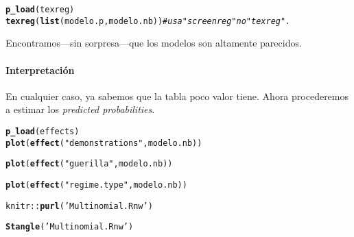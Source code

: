 \documentclass[onesided]{article}\usepackage[]{graphicx}\usepackage[]{color}
\makeatletter
\newcommand{\hlstr}[1]{\textcolor[rgb]{0.192,0.494,0.8}{#1}}%
\newcommand{\hlcom}[1]{\textcolor[rgb]{0.678,0.584,0.686}{\textit{#1}}}%
\newcommand{\hlopt}[1]{\textcolor[rgb]{0,0,0}{#1}}%
\newcommand{\hlstd}[1]{\textcolor[rgb]{0.345,0.345,0.345}{#1}}%
\newcommand{\hlkwd}[1]{\textcolor[rgb]{0.737,0.353,0.396}{\textbf{#1}}}%
\newenvironment{kframe}{%
 \def\at@end@of@kframe{}%
 \ifinner\ifhmode%
  \def\at@end@of@kframe{\end{minipage}}%
  \begin{minipage}{\columnwidth}%
 \fi\fi%
 \def\FrameCommand##1{\hskip\@totalleftmargin \hskip-\fboxsep
 \colorbox{shadecolor}{##1}\hskip-\fboxsep
     \hskip-\linewidth \hskip-\@totalleftmargin \hskip\columnwidth}%
 \MakeFramed {\advance\hsize-\width
   \@totalleftmargin\z@ \linewidth\hsize
   \@setminipage}}%
 {\par\unskip\endMakeFramed%
 \at@end@of@kframe}
\newenvironment{knitrout}{}{} %
\makeatother
\begin{document}
\begin{kframe}
\begin{alltt}
\hlkwd{p_load}\hlstd{(texreg)}
\hlkwd{texreg}\hlstd{(}\hlkwd{list}\hlstd{(modelo.p, modelo.nb))} \hlcom{# usa "screenreg" no "texreg".}
\end{alltt}


{\ttfamily\noindent\bfseries{}}\end{kframe}

Encontramos---sin sorpresa---que los modelos son altamente parecidos. 

\paragraph{Interpretaci\'on} En cualquier caso, ya sabemos que la tabla poco valor tiene. Ahora procederemos a estimar los \emph{predicted probabilities}.


\begin{kframe}
\begin{alltt}
\hlkwd{p_load}\hlstd{(effects)}
\hlkwd{plot}\hlstd{(}\hlkwd{effect}\hlstd{(}\hlstr{"demonstrations"}\hlstd{, modelo.nb))}
\end{alltt}


{\ttfamily\noindent\bfseries{}}\begin{alltt}
\hlkwd{plot}\hlstd{(}\hlkwd{effect}\hlstd{(}\hlstr{"guerilla"}\hlstd{, modelo.nb))}
\end{alltt}


{\ttfamily\noindent\bfseries{}}\begin{alltt}
\hlkwd{plot}\hlstd{(}\hlkwd{effect}\hlstd{(}\hlstr{"regime.type"}\hlstd{, modelo.nb))}
\end{alltt}


{\ttfamily\noindent\bfseries{}}\end{kframe}



\begin{knitrout}
\color{fgcolor}\begin{kframe}
\begin{alltt}
\hlstd{knitr}\hlopt{::}\hlkwd{purl}\hlstd{(}\hlstr{'Multinomial.Rnw'}\hlstd{)}
\end{alltt}


{\ttfamily\noindent\bfseries{}}\begin{alltt}
\hlkwd{Stangle}\hlstd{(}\hlstr{'Multinomial.Rnw'}\hlstd{)}
\end{alltt}


{\ttfamily\noindent\bfseries\color{errorcolor}{\#\# Error in SweaveReadFile(file, syntax, encoding = encoding): no Sweave file with name 'Multinomial.Rnw' found}}\end{kframe}
\end{knitrout}
\end{document}
